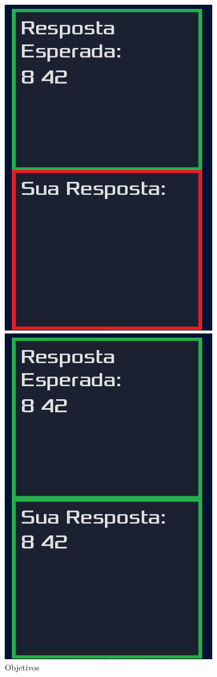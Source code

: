 \begin{figure}[H]
    \centering
    \begin{minipage}{.4\textwidth}
      \centering
      \includegraphics[scale=0.3]{../figuras/saida.png}
    \end{minipage}%
    \begin{minipage}{.4\textwidth}
      \centering
      \includegraphics[scale=0.3]{../figuras/objetivo_alcancado.png}
    \end{minipage}
    \caption{Objetivos}
\end{figure}

